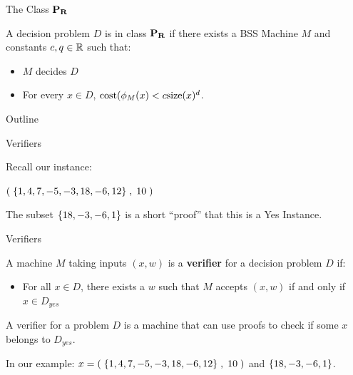 \documentclass[c]{beamer}
\begin{document}
\begin{frame}{The Class $\mathbf{P_R}$}
  
  A decision problem $D$ is in class $\mathbf{P_R}$ if there exists a BSS
  Machine $M$ and constants $c, q \in \mathbb{R}$ such that:
  \begin{itemize}
  \item $M$ decides $D$
  \item For every $x \in D$, $\text{cost}(\phi_M(x) < c \text{size}(x)^d$.
  \end{itemize}
  
\end{frame}

\begin{frame}{Outline}
  \begin{center}
    \scaletopagewidth{\outlinefinal}
  \end{center}
\end{frame}

\begin{frame}{Verifiers}

  Recall our \subsum{} instance:

  \vspace{\baselineskip}

  $(\;\{1,4,7,-5,-3,18,-6,12\}\;, \;10\;)$\pause

  \vspace{\baselineskip}

  The subset $\{18, -3, -6, 1\}$ is a short ``proof'' that this is a
  Yes Instance.

  \vspace{\baselineskip}

\end{frame}

\begin{frame}{Verifiers}

  A machine $M$ taking inputs $(x, w)$ is a \textbf{verifier} for a decision
  problem $D$ if:

  \begin{itemize}
  \item For all $x \in D$, there exists a $w$ such that $M$ accepts
    $(x, w)$ if and only if $x \in D_{yes}$
  \end{itemize}\pause

  A verifier for a problem $D$ is a machine that can use proofs to
  check if some $x$ belongs to $D_{yes}$.\pause

  \vspace{\baselineskip}

  In our example: $x = (\;\{1,4,7,-5,-3,18,-6,12\}\;, \;10\;)$ and
  $\{18, -3, -6, 1\}$.

\end{frame}
\end{document}
